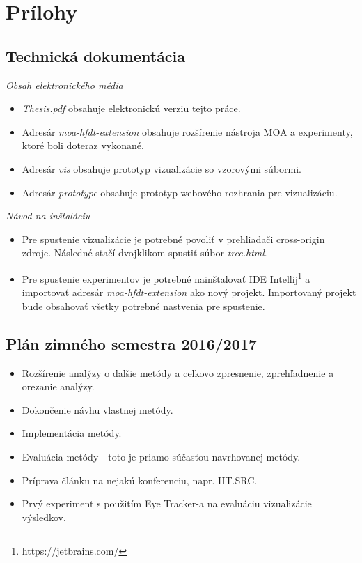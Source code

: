 \label{app.01}
\chapter*{Prílohy}
\renewcommand{\thesection}{\Alph{section}}

\section{Technická dokumentácia}\label{tech-doku}
\textit{Obsah elektronického média}
\begin{itemize}
	\item \textit{Thesis.pdf} obsahuje elektronickú verziu tejto práce.
	\item Adresár \textit{moa-hfdt-extension} obsahuje rozšírenie nástroja MOA a experimenty, ktoré boli doteraz vykonané.
	\item Adresár \textit{vis} obsahuje prototyp vizualizácie so vzorovými súbormi.
	\item Adresár \textit{prototype} obsahuje prototyp webového rozhrania pre vizualizáciu.
\end{itemize}

\textit{Návod na inštaláciu}
\begin{itemize}
	\item Pre spustenie vizualizácie je potrebné povoliť v prehliadači cross-origin zdroje. Následné stačí dvojklikom spustiť súbor \textit{tree.html}.
	\item Pre spustenie experimentov je potrebné nainštalovať IDE Intellij\footnote{https://jetbrains.com/} a importovať adresár \textit{moa-hfdt-extension} ako nový projekt. Importovaný projekt bude obsahovať všetky potrebné nastvenia pre spustenie.
\end{itemize}



\newpage
\section{Plán zimného semestra 2016/2017}\label{plan-zima}
\begin{itemize}
	\item Rozšírenie analýzy o ďalšie metódy a celkovo zpresnenie, zprehľadnenie a orezanie analýzy.
	\item Dokončenie návhu vlastnej metódy.
	\item Implementácia metódy.
	\item Evaluácia metódy - toto je priamo súčasťou navrhovanej metódy.
	\item Príprava článku na nejakú konferenciu, napr. IIT.SRC.
	\item Prvý experiment s použitím Eye Tracker-a na evaluáciu vizualizácie výsledkov.
\end{itemize}

